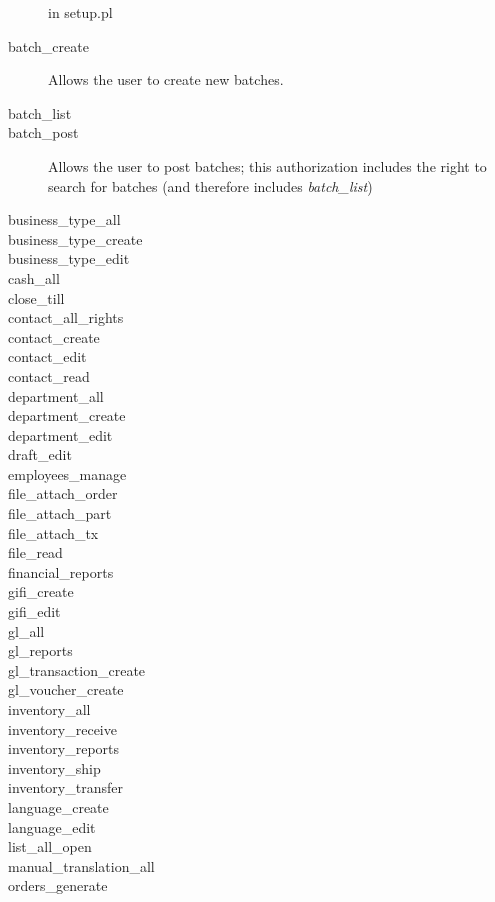 \begin{description}
   in setup.pl
\item [batch\_create] Allows the user to create new batches.
\item [batch\_list]
\item [batch\_post] Allows the user to post batches; this authorization includes the
   right to search for batches (and therefore includes \emph{batch\_list})
\item [business\_type\_all]
\item [business\_type\_create]
\item [business\_type\_edit]
\item [cash\_all]
\item [close\_till]
\item [contact\_all\_rights]
\item [contact\_create]
\item [contact\_edit]
\item [contact\_read]
\item [department\_all]
\item [department\_create]
\item [department\_edit]
\item [draft\_edit]
\item [employees\_manage]
\item [file\_attach\_order]
\item [file\_attach\_part]
\item [file\_attach\_tx]
\item [file\_read]
\item [financial\_reports]
\item [gifi\_create]
\item [gifi\_edit]
\item [gl\_all]
\item [gl\_reports]
\item [gl\_transaction\_create]
\item [gl\_voucher\_create]
\item [inventory\_all]
\item [inventory\_receive]
\item [inventory\_reports]
\item [inventory\_ship]
\item [inventory\_transfer]
\item [language\_create]
\item [language\_edit]
\item [list\_all\_open]
\item [manual\_translation\_all]
\item [orders\_generate]

\end{description}
